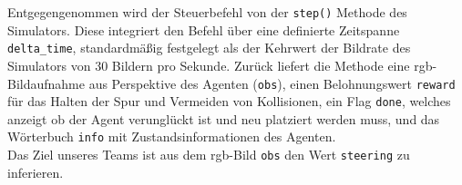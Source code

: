 Entgegengenommen wird der Steuerbefehl von der \texttt{step()} Methode des Simulators. Diese integriert den Befehl über eine definierte Zeitspanne \texttt{delta\_time}, standardmäßig festgelegt als der Kehrwert der Bildrate des Simulators von 30 Bildern pro Sekunde. Zurück liefert die Methode eine \acs{rgb}-Bildaufnahme aus Perspektive des Agenten (\texttt{obs}), einen Belohnungswert \texttt{reward} für das Halten der Spur und Vermeiden von Kollisionen, ein Flag \texttt{done}, welches anzeigt ob der Agent \glqq verunglückt\grqq{} ist und neu platziert werden muss, und das Wörterbuch \texttt{info} mit Zustandsinformationen des Agenten.\\

Das Ziel unseres Teams ist aus dem \acs{rgb}-Bild \texttt{obs} den Wert \texttt{steering} zu inferieren.